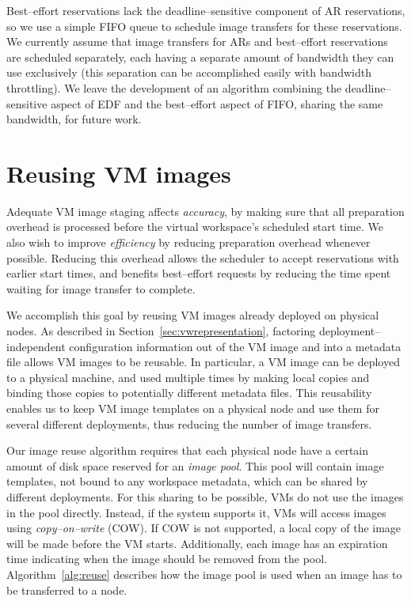 Best--effort reservations lack the deadline--sensitive component of AR reservations, so we use a simple FIFO queue to schedule image transfers for these reservations. We currently assume that image transfers for ARs and best--effort reservations are scheduled separately, each having a separate amount of bandwidth they can use exclusively (this separation can be accomplished easily with bandwidth throttling). We leave the development of an algorithm combining the deadline--sensitive aspect of EDF and the best--effort aspect of FIFO, sharing the same bandwidth, for future work.




\section{Reusing VM images}
\label{sec:reuse}

Adequate VM image staging affects \emph{accuracy}, by making sure that all preparation overhead is processed before the virtual workspace's scheduled start time. We also wish to improve \emph{efficiency} by reducing preparation overhead whenever possible. Reducing this overhead allows the scheduler to accept reservations with earlier start times, and benefits best--effort requests by reducing the time spent waiting for image transfer to complete.

We accomplish this goal by reusing VM images already deployed on physical nodes. As described in Section~\ref{sec:vwrepresentation}, factoring deployment--independent configuration information out of the VM image and into a metadata file allows VM images to be reusable. In particular, a VM image can be deployed to a physical machine, and used multiple times by making local copies and binding those copies to potentially different metadata files. This reusability enables us to keep VM image templates on a physical node and use them for several different deployments, thus reducing the number of image transfers.

Our image reuse algorithm requires that each physical node have a certain amount of disk space reserved for an \emph{image pool}. This pool will contain image templates, not bound to any workspace metadata, which can be shared by different deployments. For this sharing to be possible, VMs do not use the images in the pool directly. Instead, if the system supports it, VMs will access images using \emph{copy--on--write} (COW). If COW is not supported, a local copy of the image will be made before the VM starts. Additionally, each image has an expiration time indicating when the image should be removed from the pool. Algorithm~\ref{alg:reuse} describes how the image pool is used when an image has to be transferred to a node.


